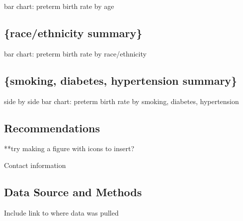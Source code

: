 bar chart: preterm birth rate by age

\subsection{\{race/ethnicity summary\}}\label{raceethnicity-summary}

bar chart: preterm birth rate by race/ethnicity

\subsection{\{smoking, diabetes, hypertension
summary\}}\label{smoking-diabetes-hypertension-summary}

side by side bar chart: preterm birth rate by smoking, diabetes,
hypertension

\subsection{Recommendations}\label{recommendations}

**try making a figure with icons to insert?

Contact information

\subsection{Data Source and Methods}\label{data-source-and-methods}

Include link to where data was pulled


